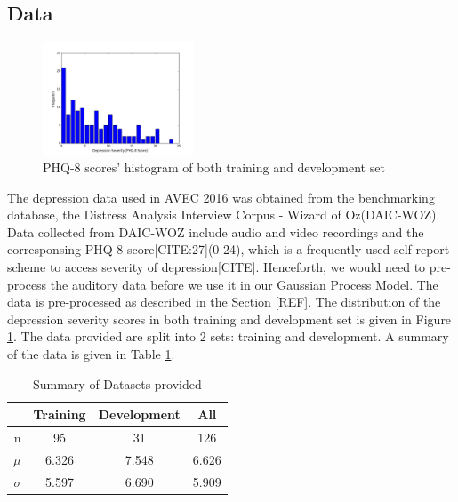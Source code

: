 \documentclass{article}
\begin{document}
	\subsection{Data}
	\begin{figure}[h]
 	\includegraphics[width=0.40\textwidth]{histogram_phq8}
	\caption{PHQ-8 scores' histogram of both training and development set}
	\label{histogram_phq8}
	\end{figure}
	
	The depression data used in AVEC 2016 was obtained from the benchmarking database, the Distress Analysis Interview Corpus - Wizard of Oz(DAIC-WOZ). Data collected from DAIC-WOZ include audio and video recordings and the corresponsing PHQ-8 score[CITE:27](0-24), which is a frequently used self-report scheme to access severity of depression[CITE]. Henceforth, we would need to pre-process the auditory data before we use it in our Gaussian Process Model. The data is pre-processed as described in the Section [REF]. The distribution of the depression severity scores in both training and development set is given in Figure \ref{histogram_phq8}. The data provided are split into 2 sets: training and development. A summary of the data is given in Table \ref{summary_table}.

 	\begin{table}[h]
 		\begin{center}
  			\begin{tabular}{ | r | c | c || c | }
    			\hline
			 & Training & Development & All \\ \hline
			 n               & 95 & 31 & 126 \\ \hline
			 $\mu$           & 6.326 & 7.548 & 6.626 \\ \hline
			 $\sigma$        & 5.597 & 6.690 & 5.909 \\ \hline
			 \end{tabular}
		\end{center}
 	\caption{Summary of Datasets provided}
 	\label{summary_table}
 	\end{table}
\end{document}

